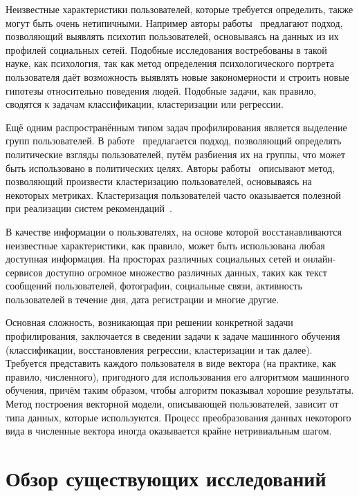 Неизвестные характеристики пользователей, которые требуется
определить, также могут быть очень нетипичными. Например
авторы работы~\cite{schwartz2013personality} предлагают
подход, позволяющий выявлять психотип пользователей, основываясь
на данных из их профилей социальных сетей. Подобные исследования
востребованы в такой науке, как психология, так как метод
определения психологического портрета пользователя даёт
возможность выявлять новые закономерности и строить новые
гипотезы относительно поведения людей. Подобные задачи,
как правило, сводятся к задачам классификации, кластеризации
или регрессии.

Ещё одним распространённым типом задач профилирования является
выделение групп пользователей. В работе~\cite{barbera2015tweeting}
предлагается подход, позволяющий определять политические взгляды
пользователей, путём разбиения их на группы, что может быть
использовано в политических целях. Авторы 
работы~\cite{maia2008identifying} описывают метод, позволяющий
произвести кластеризацию пользователей, основываясь на некоторых
метриках. Кластеризация пользователей часто оказывается полезной
при реализации систем рекомендаций~\cite{sarwar2002recommender}.

В качестве информации о пользователях, на основе которой
восстанавливаются неизвестные характеристики, как правило,
может быть использована любая доступная информация. На просторах
различных социальных сетей и онлайн-сервисов доступно огромное
множество различных данных, таких как текст сообщений пользователей,
фотографии, социальные связи, активность пользователей в течение
дня, дата регистрации и многие другие.

Основная сложность, возникающая при решении конкретной задачи
профилирования, заключается в сведении задачи к задаче машинного
обучения (классификации, восстановления регрессии, кластеризации и
так далее). Требуется представить каждого пользователя в
виде вектора (на практике, как правило, численного), пригодного для
использования его алгоритмом машинного обучения, причём таким образом,
чтобы алгоритм показывал хорошие результаты. Метод построения векторной
модели, описывающей пользователей, зависит от типа данных,
которые используются. Процесс преобразования данных некоторого вида в
численные вектора иногда оказывается крайне нетривиальным шагом.

\section{Обзор существующих исследований}
\label{sec:previous_work}

